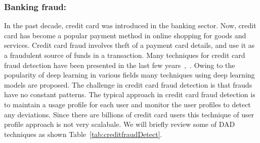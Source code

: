\subsubsection{Banking fraud:}
In the past decade, credit card was introduced in the banking sector. Now, credit card has become a popular
payment method in online shopping for goods and services. Credit card fraud involves theft of a payment card details, and use it as a fraudulent source of funds in a transaction. Many techniques for credit card fraud detection have been presented in the last few years~\cite{zhou2018state},~\cite{suganya2015survey}. Owing to the popularity of deep learning in various fields many techniques using deep learning models are proposed.
The challenge in credit card fraud detection is that frauds have no constant patterns. The typical approach in credit card fraud detection is to maintain a usage profile for each user and monitor the user profiles to detect any deviations. Since there are billions of credit card users this technique of user profile approach is not very scalabale. We will briefly review some of DAD techniques as shown Table~\ref{tab:creditfraudDetect}.
